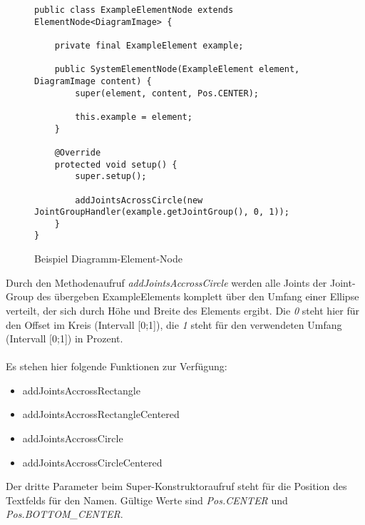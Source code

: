 \begin{figure}[h!]
	\centering
	\begin{lstlisting}
public class ExampleElementNode extends ElementNode<DiagramImage> {

    private final ExampleElement example;

    public SystemElementNode(ExampleElement element, DiagramImage content) {
        super(element, content, Pos.CENTER);

        this.example = element;
    }

    @Override
    protected void setup() {
        super.setup();

        addJointsAcrossCircle(new JointGroupHandler(example.getJointGroup(), 0, 1));
    }
}
	\end{lstlisting}
	\caption{Beispiel Diagramm-Element-Node}
\end{figure}
Durch den Methodenaufruf \textit{addJointsAccrossCircle} werden alle Joints der Joint-Group des übergeben
ExampleElements komplett über den Umfang einer Ellipse verteilt, der sich durch Höhe und Breite des Elements
ergibt. Die \textit{0} steht hier für den Offset im Kreis (Intervall [0;1]), die \textit{1} steht für den
verwendeten Umfang (Intervall [0;1]) in Prozent.
\\
\\
Es stehen hier folgende Funktionen zur Verfügung:
\begin{itemize}
	\item addJointsAccrossRectangle
	\item addJointsAccrossRectangleCentered
	\item addJointsAccrossCircle
	\item addJointsAccrossCircleCentered
\end{itemize}
Der dritte Parameter beim Super-Konstruktoraufruf steht für die Position des Textfelds für den Namen. Gültige
Werte sind \textit{Pos.CENTER} und \textit{Pos.BOTTOM\_CENTER}.

